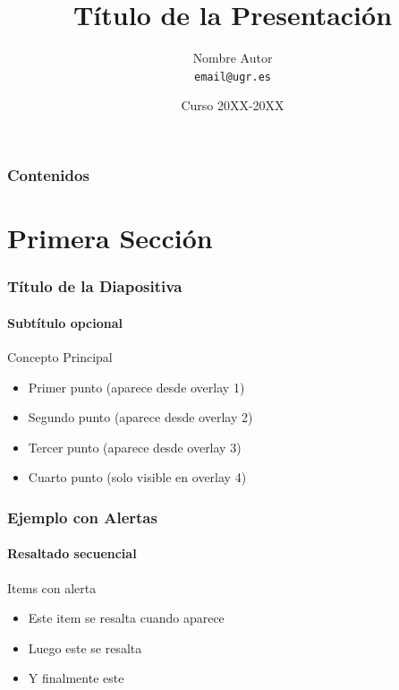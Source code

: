 \documentclass{beamer}
\title{Título de la Presentación}
\author{Nombre Autor \\ \texttt{email@ugr.es}}
\institute[]{%
    Departamento\\
    Universidad de Granada
}
\date{Curso 20XX-20XX}
\newenvironment{caja}[1]{%
    \begin{beamerboxesrounded}[upper=upcol,lower=lowcol,shadow=true]{#1}%
}{%
    \end{beamerboxesrounded}%
}
\begin{document}
\begin{frame}
    \titlepage
\end{frame}

\begin{frame}
    \frametitle{Contenidos}
    \tableofcontents
\end{frame}

\section{Primera Sección}

\begin{frame}
    \frametitle{Título de la Diapositiva}
    \framesubtitle{Subtítulo opcional}
    
    \begin{caja}{Concepto Principal}
        \begin{itemize}
            \item<1-> Primer punto (aparece desde overlay 1)
            \item<2-> Segundo punto (aparece desde overlay 2)
            \item<3-> Tercer punto (aparece desde overlay 3)
            \item<4> Cuarto punto (solo visible en overlay 4)
        \end{itemize}
    \end{caja}
\end{frame}

\begin{frame}
    \frametitle{Ejemplo con Alertas}
    \framesubtitle{Resaltado secuencial}
    
    \begin{caja}{Items con alerta}
        \begin{itemize}[<+-| alert@+>]
            \item Este item se resalta cuando aparece
            \item Luego este se resalta
            \item Y finalmente este
        \end{itemize}
    \end{caja}
\end{frame}
\end{document}
